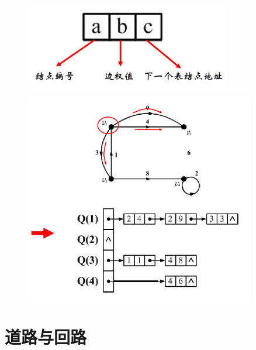\documentclass[11pt,a4paper,openany]{book}
\begin{document}
\begin{figure}[H]
  \centering
  \includegraphics[width=0.8\textwidth]{1.17.1.png}\\
  \caption*{}
\end{figure}
\begin{figure}[H]
  \centering
  \includegraphics[width=0.9\textwidth]{1.18.png}\\
  \caption*{}
\end{figure}

\chapter{道路与回路}
\end{document}
